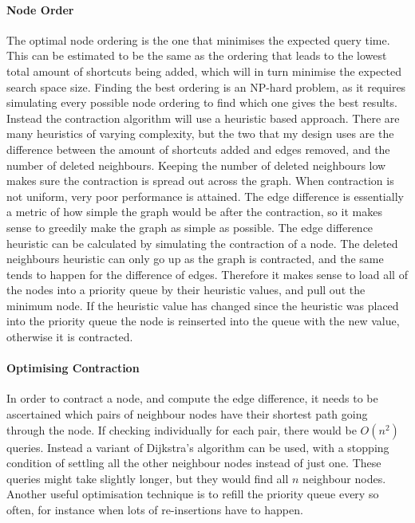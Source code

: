 \documentclass[11pt,twoside,a4paper]{report}
\begin{document}
\paragraph{Node Order}
The optimal node ordering is the one that minimises the expected query time. This can be estimated to be the same as the ordering that leads to the lowest total amount of shortcuts being added, which will in turn minimise the expected search space size.
Finding the best ordering is an NP-hard problem, as it requires simulating every possible node ordering to find which one gives the best results. Instead the contraction algorithm will use a heuristic based approach. There are many heuristics of varying complexity, but the 
two that my design uses are the difference between the amount of shortcuts added and edges removed, and the number of deleted neighbours. Keeping the number of deleted neighbours low makes sure the contraction is spread out across the graph. When contraction is not uniform, very poor performance is attained.
The edge difference is essentially a metric of how simple the graph would be after the contraction, so it makes sense to greedily make the graph as simple as possible. The edge difference heuristic can be calculated by simulating the contraction of a node.
The deleted neighbours heuristic can only go up as the graph is contracted, and the same tends to happen for the difference of edges. Therefore it makes sense to load all of the nodes into a priority queue by their heuristic values,
and pull out the minimum node. If the heuristic value has changed since the heuristic was placed into the priority queue the node is reinserted into the queue with the new value, otherwise it is contracted.    
\paragraph{Optimising Contraction}
In order to contract a node, and compute the edge difference, it needs to be ascertained which pairs of neighbour nodes have their shortest path going through the node. If checking individually for each pair, there would be $O(n^2)$ queries.
Instead a variant of Dijkstra's algorithm can be used, with a stopping condition of settling all the other neighbour nodes instead of just one. These queries might take slightly longer, but they would find all $n$ neighbour nodes.
Another useful optimisation technique is to refill the priority queue every so often, for instance when lots of re-insertions have to happen. 
\end{document}
